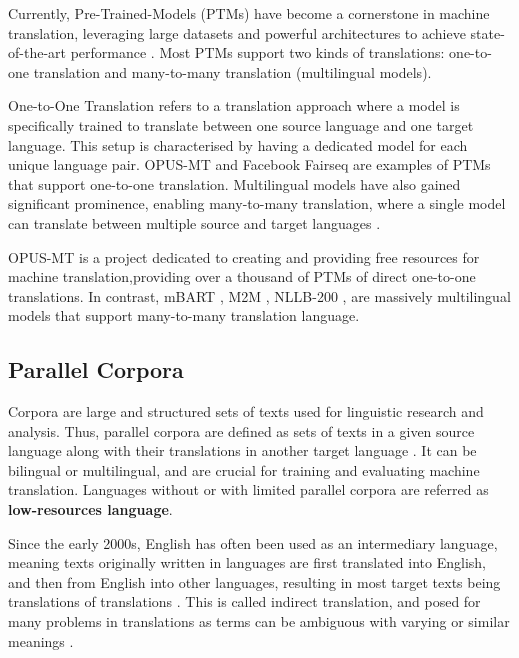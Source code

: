 \documentclass[a4paper]{article}
\begin{document}
Currently, Pre-Trained-Models (PTMs) have become a cornerstone in machine translation, leveraging large datasets and powerful architectures to achieve state-of-the-art performance \cite{han-2021-ptms}. Most PTMs support two kinds of translations: one-to-one translation and many-to-many translation (multilingual models).

One-to-One Translation refers to a translation approach where a model is specifically trained to translate between one source language and one target language. This setup is characterised by having a dedicated model for each unique language pair. OPUS-MT \cite{tiedemann-2020-opus-mt} and Facebook Fairseq \cite{ott-2019-fairseq} are examples of PTMs that support one-to-one translation. Multilingual models have also gained significant prominence, enabling many-to-many translation, where a single model can translate between multiple source and target languages \cite{aharoni-2019-massively-multilingual}.

OPUS-MT \cite{tiedemann-2020-opus-mt} is a project dedicated to creating and providing free resources for machine translation,providing over a thousand of PTMs of direct one-to-one translations. In contrast, mBART \cite{liu-2020-mbart}, M2M \cite{fan-2020-m2m100}, NLLB-200 \cite{nllb200-2020}, are massively multilingual models that support many-to-many translation language.

\subsection{Parallel Corpora}

Corpora are large and structured sets of texts used for linguistic research and analysis. Thus, parallel corpora are defined as sets of texts in a given source language along with their translations in another target language \cite{lefer-2020-parallel-corpora}. It can be bilingual or multilingual, and are crucial for training and evaluating machine translation. Languages without or with limited parallel corpora are referred as \textbf{low-resources language}.

Since the early 2000s, English has often been used as an intermediary language, meaning texts originally written in languages are first translated into English, and then from English into other languages, resulting in most target texts being translations of translations \cite{lefer-2020-parallel-corpora}. This is called indirect translation, and posed for many problems in translations as terms can be ambiguous with varying or similar meanings \cite{rosa-2017-indirect-translation-problems}.
\end{document}
